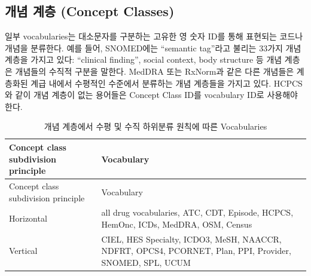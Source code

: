 \documentclass[11pt]{book}
\theoremstyle{definition}
\theoremstyle{definition}
\theoremstyle{definition}
\theoremstyle{remark}
\begin{document}
\subsection{개념 계층 (Concept Classes)}\label{--concept-classes}

일부 vocabularies는 대소문자를 구분하는 고유한 영 숫자 ID를 통해
표현되는 코드나 개념을 분류한다. 예를 들어, SNOMED에는 ``semantic
tag''라고 불리는 33가지 개념 계층을 가지고 있다: ``clinical finding'',
social context, body structure 등 개념 계층은 개념들의 수직적 구분을
말한다. MedDRA 또는 RxNorm과 같은 다른 개념들은 계층화된 계급 내에서
수평적인 수준에서 분류하는 개념 계층들을 가지고 있다. HCPCS와 같이 개념
계층이 없는 용어들은 Concept Class ID를 vocabulary ID로 사용해야 한다.

\begin{longtable}[]{@{}ll@{}}
\caption{\label{tab:sublassification}개념 계층에서 수평 및 수직 하위분류
원칙에 따른 Vocabularies}\tabularnewline
\toprule
\begin{minipage}[b]{0.13\columnwidth}\raggedright\strut
Concept class subdivision principle\strut
\end{minipage} & \begin{minipage}[b]{0.47\columnwidth}\raggedright\strut
Vocabulary\strut
\end{minipage}\tabularnewline
\midrule
\endfirsthead
\toprule
\begin{minipage}[b]{0.13\columnwidth}\raggedright\strut
Concept class subdivision principle\strut
\end{minipage} & \begin{minipage}[b]{0.47\columnwidth}\raggedright\strut
Vocabulary\strut
\end{minipage}\tabularnewline
\midrule
\endhead
\begin{minipage}[t]{0.13\columnwidth}\raggedright\strut
Horizontal\strut
\end{minipage} & \begin{minipage}[t]{0.47\columnwidth}\raggedright\strut
all drug vocabularies, ATC, CDТ, Episode, HCPCS, HemOnc, ICDs, MedDRA,
OSM, Census\strut
\end{minipage}\tabularnewline
\begin{minipage}[t]{0.13\columnwidth}\raggedright\strut
Vertical\strut
\end{minipage} & \begin{minipage}[t]{0.47\columnwidth}\raggedright\strut
CIEL, HES Specialty, ICDO3, MeSH, NAACCR, NDFRT, OPCS4, PCORNET, Plan,
PPI, Provider, SNOMED, SPL, UCUM\strut

\end{minipage}
\end{longtable}
\end{document}
